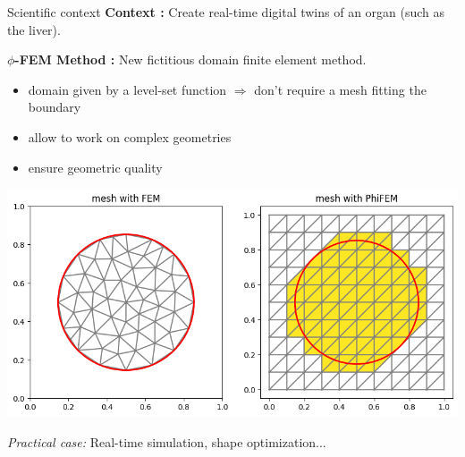 \begin{frame}{Scientific context}
    \textbf{Context :} Create real-time digital twins of an organ (such as the liver).

    \textbf{$\phi$-FEM Method :} New fictitious domain finite element method.

    \begin{itemize}[]
        \item domain given by a level-set function $\Rightarrow$ don't require a mesh fitting the boundary 
        \item allow to work on complex geometries 
        \item ensure geometric quality 
    \end{itemize}
    
    \begin{center}
        \includegraphics[width=0.65\linewidth]{images/intro/context_geometry.png}
    \end{center}	

    \textit{Practical case:} Real-time simulation, shape optimization...
\end{frame}

